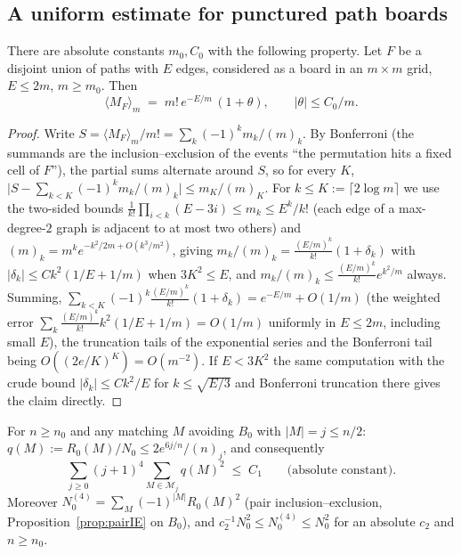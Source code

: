 \subsection{A uniform estimate for punctured path boards}

\begin{lemma}\label{lem:uniform}
There are absolute constants $m_0, C_0$ with the following property.
Let $F$ be a disjoint union of paths with $E$ edges, considered as a
board in an $m\times m$ grid, $E\le 2m$, $m\ge m_0$.  Then
\[
\langle M_F\rangle_m\;=\;m!\,e^{-E/m}\,(1+\theta),
\qquad |\theta|\le C_0/m .
\]
\end{lemma}

\begin{proof}
Write $S=\langle M_F\rangle_m/m!=\sum_k(-1)^k m_k/(m)_k$.  By Bonferroni
(the summands are the inclusion--exclusion of the events ``the
permutation hits a fixed cell of $F$''), the partial sums alternate
around $S$, so for every $K$,
$\bigl|S-\sum_{k<K}(-1)^km_k/(m)_k\bigr|\le m_K/(m)_K$.
For $k\le K:=\lceil2\log m\rceil$ we use the two-sided bounds
$\frac1{k!}\prod_{i<k}(E-3i)\le m_k\le E^k/k!$ (each edge of a
max-degree-$2$ graph is adjacent to at most two others) and
$(m)_k=m^ke^{-k^2/2m+O(k^3/m^2)}$, giving
$m_k/(m)_k=\frac{(E/m)^k}{k!}(1+\delta_k)$ with
$|\delta_k|\le Ck^2(1/E+1/m)$ when $3K^2\le E$, and
$m_k/(m)_k\le\frac{(E/m)^k}{k!}e^{k^2/m}$ always.  Summing,
$\sum_{k<K}(-1)^k\frac{(E/m)^k}{k!}(1+\delta_k)=e^{-E/m}+O(1/m)$
(the weighted error $\sum_k\frac{(E/m)^k}{k!}k^2(1/E+1/m)=O(1/m)$
uniformly in $E\le2m$, including small $E$), the truncation tails of the
exponential series and the Bonferroni tail being
$O((2e/K)^K)=O(m^{-2})$.  If $E<3K^2$ the same computation with the
crude bound $|\delta_k|\le Ck^2/E$ for $k\le\sqrt{E/3}$ and Bonferroni
truncation there gives the claim directly.
\end{proof}

\begin{corollary}\label{cor:moments}
For $n\ge n_0$ and any matching $M$ avoiding $B_0$ with $|M|=j\le n/2$:
$q(M):=R_0(M)/N_0\le 2e^{6j/n}/(n)_j$, and consequently
\[
\sum_{j\ge0}(j+1)^4\!\!\sum_{M\in\mathcal M_j}\!q(M)^2\;\le\;C_1
\qquad\text{(absolute constant)} .
\]
Moreover $N^{(4)}_0=\sum_M(-1)^{|M|}R_0(M)^2$ (pair inclusion--exclusion,
Proposition~\ref{prop:pairIE} on $B_0$), and $c_2^{-1}N_0^2\le
N^{(4)}_0\le N_0^2$ for an absolute $c_2$ and $n\ge n_0$.
\end{corollary}

